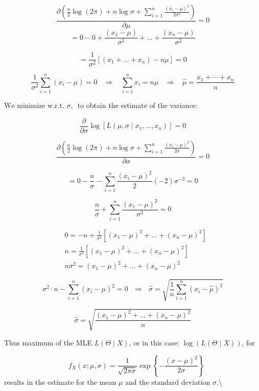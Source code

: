 \documentclass[
  12 pt,
  a4paper,
]{book}
\numberwithin{equation}{section}
\theoremstyle{plain}      %
\theoremstyle{definition} %
\theoremstyle{remark}     %
\theoremstyle{note}         %
\begin{document}
\[
\frac{\partial \left( \frac{n}{2} \log (2 \pi) + {n} \log \sigma+\sum_{i=1}^{n} \frac{\left(x_{i}-\mu\right)^{2}}{2 \sigma^{2}}\right)}{\partial \mu}= 0
\] \[
=0-0+\frac{\left(x_{1}-\mu\right)}{\sigma^{2}}+\ldots+\frac{\left(x_{n}-\mu\right)}{\sigma^{2}}
\]

\[
=\frac{1}{\sigma^{2}}\left[\left(x_{1}+\ldots+x_{n}\right)-n \mu\right]=0
\]

\[
\frac{1}{\sigma^{2}} \sum_{i=1}^{n} \left(x_{i}-\mu\right)=0 ~~~~ \Rightarrow ~~~~ \sum_{i=1}^{n}  x_{i}=n \mu ~~~~ \Rightarrow ~~~~ \widehat{\mu}=\frac{x_{1}+\cdots+x_{n}}{n}
\]

\(\text {We minimize w.r.t. } \sigma \text {, }\) to obtain the estimate
of the variance:

\[
\frac{\partial}{\partial \sigma} \log \left[L\left(\mu, \sigma \mid x_{1}, \ldots, x_{n}\right)\right] = 0
\]

\[
\frac{\partial \left( \frac{n}{2} \log (2 \pi) + {n} \log \sigma+\sum_{i=1}^{n} \frac{\left(x_{i}-\mu\right)^{2}}{2 \sigma}\right)}{\partial \sigma}= 0
\]

\[
=0-\frac{n}{\sigma} -\sum_{i=1}^{n}\frac{\left(x_{i}-\mu\right)^{2}}{2}(-2) \sigma^{-3} = 0
\]

\[
\frac{n}{\sigma}+\sum_{i=1}^{n}\frac{\left(x_{1}-\mu\right)^{2}}{\sigma^{3}} = 0 
\]

\[
\begin{aligned}
&0=-n+\frac{1}{\sigma^{2}}\left[\left(x_{1}-\mu\right)^{2}+\ldots+\left(x_{n}-\mu\right)^{2}\right] \\
&n=\frac{1}{\sigma^{2}}\left[\left(x_{1}-\mu\right)^{2}+\ldots+\left(x_{n}-\mu\right)^{2}\right] \\
&n \sigma^{2}=\left(x_{1}-\mu\right)^{2}+\ldots+\left(x_{n}-\mu\right)^{2}
\end{aligned}
\]

\[
\sigma^{2} \cdot n -\sum_{i=1}^{n} \left(x_{i}-\mu\right)^{2}=0 ~~~ \Rightarrow ~~~ \widehat{\sigma}=\sqrt{\frac{1}{n} \sum_{i=1}^{n}\left(x_{i}-\widehat{\mu}\right)^{2}}
\]

\[
\widehat{\sigma}=\sqrt{\frac{\left(x_{1}-\mu\right)^{2}+\ldots+\left(x_{n}-\mu\right)^{2}}{n}}
\]

Thus maximum of the MLE \(L\left(\Theta \mid X \right)\), or in this
case: \(\log \left(L\left(\Theta \mid X \right)\right)\), for

\[
\quad f_{X}(x ; \mu, \sigma)= \frac{1}{\sqrt{2 \pi \sigma}} \exp \left\{-\frac{\left(x-\mu\right)^{2}}{2 \sigma}\right\}
\] results in the estimate for the mean \(\mu\) and the standard
deviation \(\sigma\).\textbackslash{}
\end{document}
